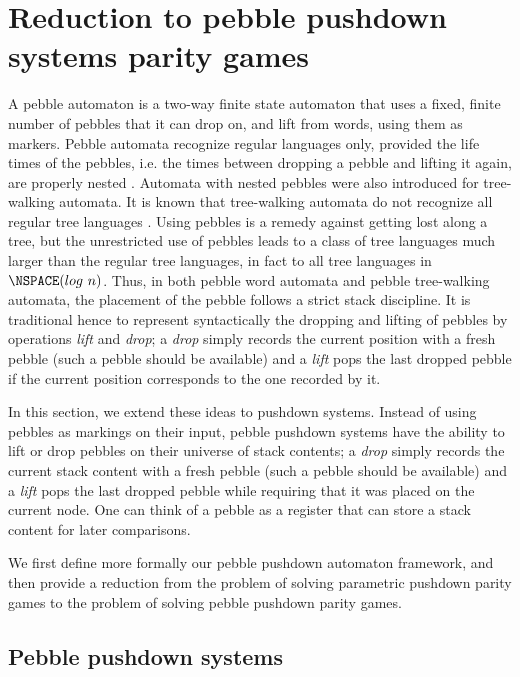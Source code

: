\documentclass[a4paper,UKenglish,cleveref, autoref, thm-restate]{lipics-v2021}
\begin{document}
			
\section{Reduction to pebble pushdown systems parity games
}\label{pebbles}


A pebble automaton is a two-way finite state automaton that uses a fixed, finite number of
pebbles that it can drop on, and lift from 
words, using them as markers.
Pebble automata recognize regular languages only, provided the life times of the pebbles, i.e. the times between dropping a pebble and lifting it again, are properly nested
\cite{globerman1996complexity, engelfriet1999tree}.
Automata with nested pebbles were also introduced
for tree-walking automata. 
It is known that tree-walking automata do not recognize all regular tree languages \cite{bojanczyk2008tree}.
Using pebbles is a remedy against getting lost along a tree, but 
the unrestricted use of pebbles leads to a class of tree languages much larger than the
regular tree languages, in fact to all tree languages in $\NSPACE(log ~ n)$.
Thus, in  both pebble word automata and pebble tree-walking automata, the placement of the pebble follows a strict stack discipline. It is traditional hence to represent syntactically the dropping and lifting of pebbles by operations \textit{lift} and \textit{drop}; a \textit{drop} simply records the current position with a fresh pebble (such a pebble should be available)  
and a \textit{lift} pops the last dropped pebble if the current position corresponds to the one recorded by it.




In this section, we extend these ideas to pushdown systems. Instead of using pebbles as markings on their input, pebble pushdown systems have the ability to lift or drop pebbles on their universe of stack contents; a \textit{drop} simply records the current stack content with a fresh pebble (such a pebble should be available)  
and a \textit{lift} pops the last dropped pebble 
while requiring that
 it was placed on the current node. 
One can think of a pebble as a register that can store a stack content for later comparisons.



We first define more formally our pebble pushdown automaton framework, and then provide a reduction from the problem of solving parametric pushdown parity games to the problem of solving pebble pushdown parity games.




\subsection{Pebble pushdown systems}
\end{document}

